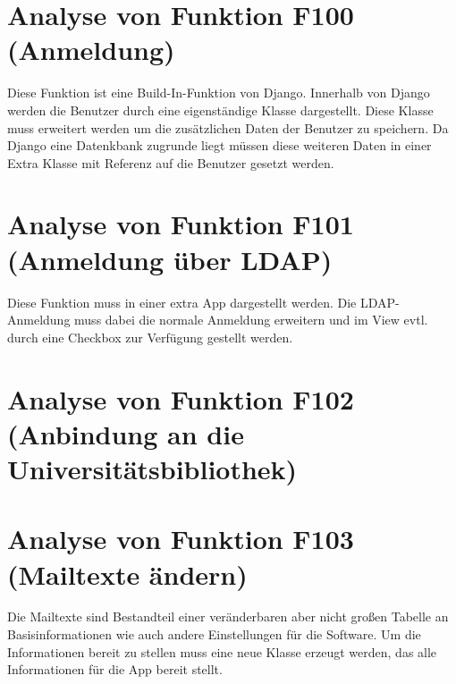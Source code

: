 \section{Analyse von Funktion F100 (Anmeldung)}
Diese Funktion ist eine Build-In-Funktion von Django. Innerhalb von Django
werden die Benutzer durch eine eigenständige Klasse dargestellt. Diese Klasse
muss erweitert werden um die zusätzlichen Daten der Benutzer zu speichern. Da
Django eine Datenkbank zugrunde liegt müssen diese weiteren Daten in einer Extra
Klasse mit Referenz auf die Benutzer gesetzt werden.

\section{Analyse von Funktion F101 (Anmeldung über LDAP)}
Diese Funktion muss in einer extra App dargestellt werden. Die LDAP-Anmeldung
muss dabei die normale Anmeldung erweitern und im View evtl. durch eine Checkbox
zur Verfügung gestellt werden.

\section{Analyse von Funktion F102 (Anbindung an die Universitätsbibliothek)}

\section{Analyse von Funktion F103 (Mailtexte ändern)}
Die Mailtexte sind Bestandteil einer veränderbaren aber nicht großen Tabelle an
Basisinformationen wie auch andere Einstellungen für die Software. Um die
Informationen bereit zu stellen muss eine neue Klasse erzeugt werden, das alle
Informationen für die App bereit stellt.
